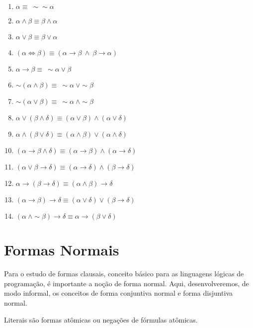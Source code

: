 \begin{enumerate}[label={\arabic*}.]
    \item $\alpha \equiv\ \sim \sim \alpha$
    \item $\alpha \land \beta \equiv \beta \land \alpha$
    \item $\alpha \lor \beta \equiv \beta \lor \alpha$
    \item $(\alpha \iff \beta) \equiv (\alpha \to \beta\ \land\ \beta \to \alpha)$
    \item $\alpha \to \beta \equiv\ \sim \alpha \lor \beta$
    \item $\sim (\alpha \land \beta) \equiv\ \sim \alpha\ \lor \sim \beta$
    \item $\sim (\alpha \lor \beta) \equiv\ \sim \alpha\ \land \sim \beta$
    \item $\alpha \lor (\beta \land \delta) \equiv (\alpha \lor \beta) \land (\alpha \lor \delta)$
    \item $\alpha \land (\beta \lor \delta) \equiv (\alpha \land \beta) \lor (\alpha \land \delta)$
    \item $(\alpha \to \beta \land \delta) \equiv (\alpha \to \beta) \land (\alpha \to \delta)$
    \item $(\alpha \lor \beta \to \delta) \equiv (\alpha \to \delta) \land (\beta \to \delta)$
    \item $\alpha \to (\beta \to \delta) \equiv (\alpha \land \beta) \to \delta$
    \item $(\alpha \to \beta) \to \delta \equiv (\alpha \lor \delta) \lor (\beta \to \delta)$
    \item $(\alpha\ \land \sim \beta) \to \delta \equiv \alpha \to (\beta \lor \delta)$
\end{enumerate}

\section{Formas Normais}
Para o estudo de formas clausais, conceito básico para as linguagens lógicas de programação, é importante a noção de forma normal.
Aqui, desenvolveremos, de modo informal, os conceitos de forma conjuntiva normal e forma disjuntiva normal.

\begin{defi}
    Literais são formas atômicas ou negações de fórmulas atômicas.
\end{defi}


